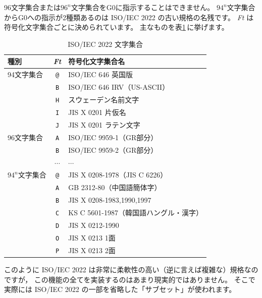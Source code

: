 \documentclass[a4j,10pt,fleqn,uplatex]{jsarticle}
\begin{document}
96文字集合または$96^n$文字集合をG0に指示することはできません。
$94^n$文字集合からG0への指示が2種類あるのは ISO/IEC 2022 の古い規格の名残です。
\textit{Ft} は符号化文字集合ごとに決められています。
主なものを表\ref{tbl:ISO2022-charset}\,に挙げます。
\begin{table}[htp]
\begin{center}\begin{tabular}{|l|c|l|}
    \hline
    種別          & \textit{Ft} & 符号化文字集合名 \\ \hline
    \hline
    94文字集合     & \texttt{@} & ISO/IEC 646 英国版 \\ \cline{2-3}
                   & \texttt{B} & ISO/IEC 646 IRV（US-ASCII） \\ \cline{2-3}
                   & \texttt{H} & スウェーデン名前文字 \\ \cline{2-3}
                   & \texttt{I} & JIS X 0201 片仮名 \\ \cline{2-3}
                   & \texttt{J} & JIS X 0201 ラテン文字 \\ \hline
    \hline
    96文字集合     & \texttt{A} & ISO/IEC 9959-1（GR部分） \\ \cline{2-3}
                   & \texttt{B} & ISO/IEC 9959-2（GR部分） \\ \cline{2-3}
                   & $\cdots$   & $\cdots$ \\ \hline
    \hline
    $94^n$文字集合 & \texttt{@} & JIS X 0208-1978（JIS C 6226） \\ \cline{2-3}
                   & \texttt{A} & GB 2312-80（中国語簡体字） \\ \cline{2-3}
                   & \texttt{B} & JIS X 0208-1983,1990,1997 \\ \cline{2-3}
                   & \texttt{C} & KS C 5601-1987（韓国語ハングル・漢字） \\ \cline{2-3}
                   & \texttt{D} & JIS X 0212-1990 \\ \cline{2-3}
                   & \texttt{O} & JIS X 0213 1面 \\ \cline{2-3}
                   & \texttt{P} & JIS X 0213 2面 \\ \hline
\end{tabular}\end{center}
\caption{ISO/IEC 2022 文字集合}\label{tbl:ISO2022-charset}
\end{table}

このように ISO/IEC 2022 は非常に柔軟性の高い（逆に言えば複雑な）規格なのですが，
この機能の全てを実装するのはあまり現実的ではありません。
そこで実際には ISO/IEC 2022 の一部を省略した「サブセット」が使われます。
\end{document}
